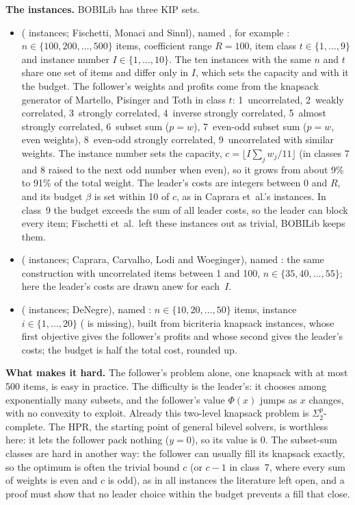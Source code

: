 \textbf{The instances.} BOBILib has three KIP sets.
\begin{itemize}\setlength{\emergencystretch}{3em}
\item {} (\NumSetKp{} instances;
Fischetti, Monaci and Sinnl\cite{fischetti2018dynamic}), named
, for example : $n\in\{100,200,\dots,500\}$
items, coefficient range $R=100$, item class $t\in\{1,\dots,9\}$ and instance number
$I\in\{1,\dots,10\}$. The ten instances with the same $n$ and $t$ share one set of items and
differ only in $I$, which sets the capacity and with it the budget. The follower's weights and
profits come from the knapsack generator of
Martello, Pisinger and Toth\cite{martello1999dynamic} in class $t$: 1~uncorrelated, 2~weakly
correlated, 3~strongly correlated, 4~inverse strongly correlated, 5~almost strongly correlated,
6~subset sum ($p=w$), 7~even-odd subset sum ($p=w$, even weights), 8~even-odd strongly
correlated, 9~uncorrelated with similar weights. The instance number sets the capacity,
$c=\lfloor I\sum_j w_j/11\rfloor$ (in classes 7 and 8 raised to the next odd number when even),
so it grows from about 9\% to 91\% of the total weight. The leader's costs are integers between
0 and $R$, and its budget $\beta$ is set within 10 of $c$, as in Caprara et~al.'s
instances.\cite{dellacroce2020exact} In class~9 the budget exceeds the sum of
all leader costs, so the leader can block every item; Fischetti et~al.\ left these instances out
as trivial, BOBILib keeps them.
\item {} (\NumSetCclw{} instances;
Caprara, Carvalho, Lodi and Woeginger\cite{caprara2016bilevel}), named
: the same construction with uncorrelated items between 1 and
100, $n\in\{35,40,\dots,55\}$; here the leader's costs are drawn anew for each~$I$.
\item {} (\NumSetInterKp{} instances;
DeNegre\cite{denegre2011thesis}), named : $n\in\{10,20,\dots,50\}$ items,
instance $i\in\{1,\dots,20\}$ ( is missing), built from bicriteria knapsack
instances, whose first objective gives the follower's profits and whose second gives the
leader's costs; the budget is half the total cost, rounded up.
\end{itemize}

\textbf{What makes it hard.} The follower's problem alone, one knapsack with at most 500 items,
is easy in practice. The difficulty is the leader's: it chooses among exponentially many subsets,
and the follower's value $\Phi(x)$ jumps as $x$ changes, with no convexity to exploit. Already
this two-level knapsack problem is $\Sigma_2^p$-complete.\cite{caprara2014complexity} The HPR,
the starting point of general bilevel solvers, is worthless here: it lets the follower pack
nothing ($y=0$), so its value is 0. The subset-sum classes are hard in another way: the follower
can usually fill its knapsack exactly, so the optimum is often the trivial bound $c$ (or $c-1$ in
class~7, where every sum of weights is even and $c$ is odd), as in all \NumNewKip{} instances
the literature left open, and a proof must show that no leader choice within the budget prevents
a fill that close.

